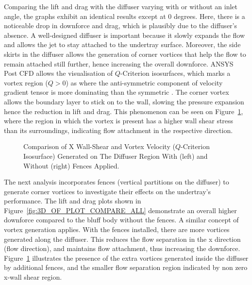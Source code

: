 \noindent Comparing the lift and drag with the diffuser varying with or without an inlet angle, the graphs exhibit an identical results except at 0 degrees. Here, there is a noticeable drop in downforce and drag, which is plausibly due to the diffuser's absence. A well-designed diffuser is important because it slowly expands the flow and allows the jet to stay attached to the undertray surface. Moreover, the side skirts in the diffuser allows the generation of corner vortices that help the flow to remain attached still further, hence increasing the overall downforce. ANSYS Post CFD allows the visualisation of $Q$-Criterion isosurfaces, which marks a vortex region ($Q > 0$) as where the anti-symmetric component of velocity gradient tensor is more dominating than the symmetric \cite{Holmen2012MethodsIdentification}. The corner vortex allows the boundary layer to stick on to the wall, slowing the pressure expansion hence the reduction in lift and drag. This phenomenon can be seen on Figure~\ref{fig:3D_OF_COMPARE_FENCES_SHEAR}, where the region in which the vortex is present has a higher wall shear stress than its surroundings, indicating flow attachment in the respective direction.

\begin{figure}[!htb]
    \centering
    \noindent{}
    \caption{Comparison of X Wall-Shear and Vortex Velocity ($Q$-Criterion Isosurface) Generated on The Diffuser Region With (left) and Without (right) Fences Applied.}
      \label{fig:3D_OF_COMPARE_FENCES_SHEAR}
\end{figure}

\noindent The next analysis incorporates fences (vertical partitions on the diffuser) to generate corner vortices to investigate their effects on the undertray's performance. The lift and drag plots shown in Figure~\ref{fig:3D_OF_PLOT_COMPARE_ALL} demonstrate an overall higher downforce compared to the bluff body without the fences. A similar concept of vortex generation applies. With the fences installed, there are more vortices generated along the diffuser. This reduces the flow separation in the x direction (flow direction), and maintains flow attachment, thus increasing the downforce. Figure~\ref{fig:3D_OF_COMPARE_FENCES_SHEAR} illustrates the presence of the extra vortices generated inside the diffuser by additional fences, and the smaller flow separation region indicated by non zero x-wall shear region. 

